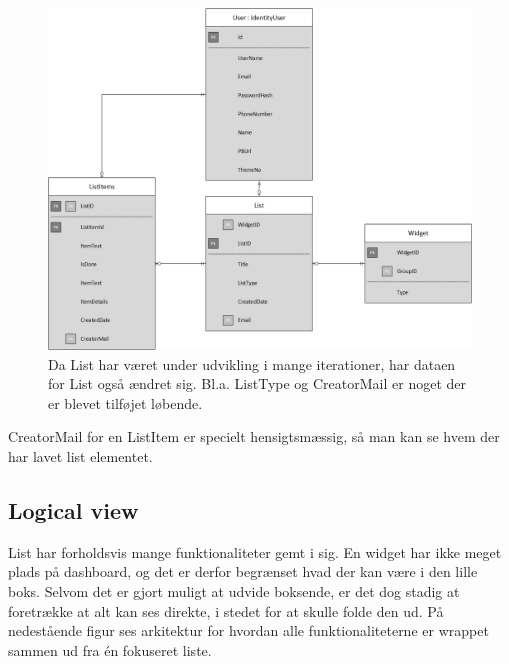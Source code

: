 \begin{figure}[H]
    \centering
    \includegraphics[width=0.9\linewidth]{09_Arkitektur/Lists/Images/ListDbFinal.png}
    \caption{Da List har været under udvikling i mange iterationer, har dataen for List også ændret sig. Bl.a. ListType og CreatorMail er noget der er blevet tilføjet løbende.}
    \label{fig:ListDbFinal}
\end{figure}

CreatorMail for en ListItem er specielt hensigtsmæssig, så man kan se hvem der har lavet list elementet. 

\subsection{Logical view}

List har forholdsvis mange funktionaliteter gemt i sig. En widget har ikke meget plads på dashboard, og det er derfor begrænset hvad der kan være i den lille boks. Selvom det er gjort muligt at udvide boksende, er det dog stadig at foretrække at alt kan ses direkte, i stedet for at skulle folde den ud. På nedestående figur ses arkitektur for hvordan alle funktionaliteterne er wrappet sammen ud fra én fokuseret liste.

